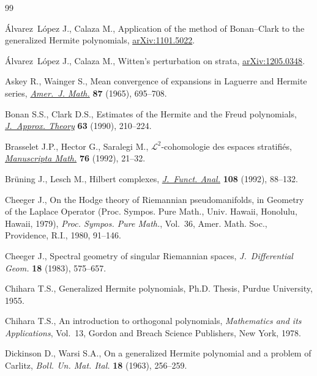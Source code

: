 \begin{thebibliography}{99}
\footnotesize\itemsep=0pt

\'Alvarez~L\'opez J., Calaza M., Application of the method of Bonan--Clark to
  the generalized Hermite polynomials, \href{http://arxiv.org/abs/1101.5022}{arXiv:1101.5022}.

\'Alvarez~L\'opez J., Calaza M., Witten's perturbation on strata,
  \href{http://arxiv.org/abs/1205.0348}{arXiv:1205.0348}.

Askey R., Wainger S., Mean convergence of expansions in {L}aguerre and
  {H}ermite series, \href{http://dx.doi.org/10.2307/2373069}{\textit{Amer.~J. Math.}} \textbf{87} (1965), 695--708.

Bonan S.S., Clark D.S., Estimates of the {H}ermite and the {F}reud polynomials,
  \href{http://dx.doi.org/10.1016/0021-9045(90)90104-X}{\textit{J.~Approx. Theory}} \textbf{63} (1990), 210--224.

Brasselet J.P., Hector G., Saralegi M., {${\mathcal L}^2$}-cohomologie des
  espaces stratif\/i\'es, \href{http://dx.doi.org/10.1007/BF02567744}{\textit{Manuscripta Math.}} \textbf{76} (1992), 21--32.

Br{\"u}ning J., Lesch M., Hilbert complexes, \href{http://dx.doi.org/10.1016/0022-1236(92)90147-B}{\textit{J.~Funct. Anal.}}
  \textbf{108} (1992), 88--132.

Cheeger J., On the {H}odge theory of {R}iemannian pseudomanifolds, in Geometry
  of the {L}aplace Operator ({P}roc. {S}ympos. {P}ure {M}ath., {U}niv.
  {H}awaii, {H}onolulu, {H}awaii, 1979), \textit{Proc. Sympos. Pure Math.},
  Vol.~36, Amer. Math. Soc., Providence, R.I., 1980, 91--146.

Cheeger J., Spectral geometry of singular {R}iemannian spaces,
  \textit{J.~Differential Geom.} \textbf{18} (1983), 575--657.

Chihara T.S., Generalized Hermite polynomials, Ph.D. Thesis, Purdue University,
  1955.

Chihara T.S., An introduction to orthogonal polynomials, \textit{Mathematics
  and its Applications}, Vol.~13, Gordon and Breach Science Publishers, New
  York, 1978.

Dickinson D., Warsi S.A., On a generalized {H}ermite polynomial and a problem
  of {C}arlitz, \textit{Boll. Un. Mat. Ital.} \textbf{18} (1963), 256--259.


\end{thebibliography}
